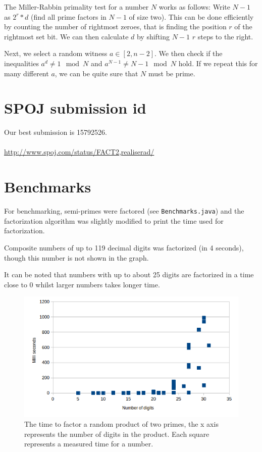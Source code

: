 \documentclass{article}
\begin{document}
The Miller-Rabbin primality test for a number $N$ works as follows: Write $N-1$ as $2^r*d$ (find all prime factors in $N-1$ of size two). This can be done efficiently by counting the number of rightmost zeroes, that is finding the position $r$ of the rightmost set bit. We can then calculate $d$ by shifting $N-1$ $r$ steps to the right.

Next, we select a random witness $a \in [2, n-2]$. We then check if the inequalities $a^{d} \neq 1 \mod N$ and $a^{N-1}\neq N-1 \mod N$ hold. If we repeat this for many different $a$, we can be quite sure that $N$ must be prime. 
\section{SPOJ submission id}

Our best submission is 15792526.
\\\\
\url{http://www.spoj.com/status/FACT2,realiserad/}

\section{Benchmarks}
For benchmarking, semi-primes were factored (see \verb!Benchmarks.java!) and the factorization algorithm was slightly modified to print the time used for factorization. 

Composite numbers of up to 119 decimal digits was factorized (in 4 seconds), though this number is not shown in the graph.

It can be noted that numbers with up to about 25 digits are factorized in a time close to 0 whilst larger numbers takes longer time.

\begin{figure}
\centering
\includegraphics[width=\textwidth]{faktorisera_tider}
\caption{The time to factor a random product of two primes, the x axis represents the number of digits in the product. Each square represents a measured time for a number.}
\label{fig:my_label}
\end{figure}
\end{document}
